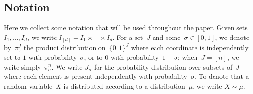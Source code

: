 \subsection{Notation}
\label{sec:prelims}

Here we collect some notation that will be used throughout the paper.
Given sets  $I_1, \dots, I_d$, we write $I_{[d]} = I_1\times \cdots\times I_d$.
For a set~$J$ and some~$\sigma \in [0,1]$, we denote by~$\pi_{\sigma}^J$ the product distribution on~$\{0,1\}^J$ where each coordinate is independently set to $1$ with probability~$\sigma$, or to $0$ with probability~$1-\sigma$;
when~$J=[n]$, we write simply~$\pi_{\sigma}^n$.
We write $J_\sigma$ for the probability distribution over subsets of~$J$ where each element is present independently with probability~$\sigma$.
To denote that a random variable~$X$ is distributed according to a distribution~$\mu$, we write $X\sim \mu$.
